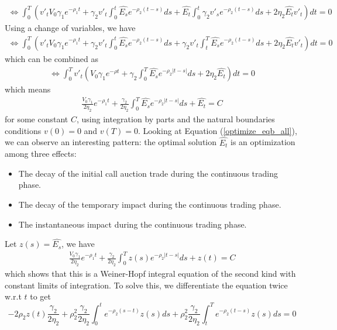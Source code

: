 \documentclass{article}
\begin{document}
\[
\begin{aligned}
\Leftrightarrow \int_0^T \left( {v'}_t V_0 \gamma_1 e^{-\rho_1 t}
+ \gamma_2 {v'}_t \int_0^t  \hat{E_s} e^{-\rho_2(t-s)} ds
+ \hat{E_t} \int_0^t  \gamma_2 {v'}_s e^{-\rho_2(t-s)} ds
+ 2 \eta_2 \hat{E_t} {v'}_t  \right)dt=0
\end{aligned}
\]
Using a change of variables, we have
\[
\begin{aligned}
\Leftrightarrow \int_0^T \left( {v'}_t V_0 \gamma_1 e^{-\rho_1 t}
+ \gamma_2 {v'}_t \int_0^t  \hat{E_s} e^{-\rho_2(t-s)} ds
+ \gamma_2 {v'}_t \int_t^T  \hat{E_s} e^{-\rho_2(t-s)} ds
+ 2 \eta_2 \hat{E_t} {v'}_t  \right)dt=0
\end{aligned}
\]
which can be combined as
\[
\begin{aligned}
\Leftrightarrow \int_0^T {v'}_t  \left(V_0 \gamma_1 e^{-\rho t}
+ \gamma_2 \int_0^T  \hat{E_s} e^{-\rho_2|t-s|} ds
+ 2 \eta_2 \hat{E_t} \right)dt=0
\end{aligned}
\]
which means
\begin{equation}\label{optimize_eqb_all}
\begin{aligned}
\frac{V_0 \gamma_1}{2 \eta_2} e^{-\rho_1 t}
+ \frac{\gamma_2}{2 \eta_2} \int_0^T  \hat{E_s} e^{-\rho_2|t-s|} ds
+ \hat{E_t} = C
\end{aligned}
\end{equation}
for some constant $C$, using integration by parts and the natural boundaries conditions $v(0)=0$ and $v(T)=0$.
Looking at Equation (\ref{optimize_eqb_all}), we can observe an interesting pattern: the optimal solution $\hat{E_t}$ is an optimization among three effects: 
\begin{itemize}
\item The decay of the initial call auction trade during the continuous trading phase.
\item The decay of the temporary impact during the continuous trading phase.
\item The instantaneous impact during the continuous trading phase.
\end{itemize}
 Let $z(s)=\hat{E_s}$, we have
\[
\begin{aligned}
\frac{V_0 \gamma_1}{2 \eta_2} e^{-\rho_1 t}
+ \frac{\gamma_2}{2 \eta_2} \int_0^T  z(s) e^{-\rho_2|t-s|} ds
+ z(t) = C
\end{aligned}
\]
which shows that this is a Weiner-Hopf integral equation of the second kind with constant limits of integration. To solve this, we differentiate the equation twice w.r.t $t$ to get
\[
-2 \rho_2 z(t) \frac{\gamma_2}{2 \eta_2} + \rho_2^2 \frac{\gamma_2}{2 \eta_2} \int_0^t e^{-\rho_2(s-t)} z(s) ds + \rho_2^2 \frac{\gamma_2}{2 \eta_2} \int_t^T e^{-\rho_2(t-s)} z(s) ds = 0
\]
\end{document}
